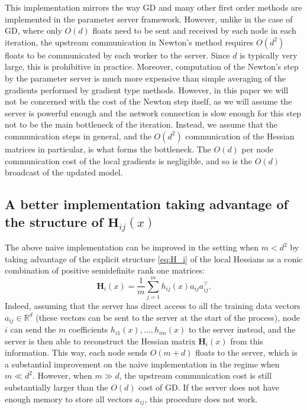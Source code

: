 \documentclass[10pt]{article}
\newcommand{\squeeze}{}
\newcommand{\R}{\mathbb{R}}
\newcommand{\newalpha}{h}
\newcommand{\mH}{\mathbf{H}}
\begin{document}
This implementation mirrors the way GD and many other first order methods are implemented in the parameter server framework. However, unlike in the case of GD, where only $O(d)$ floats need to be sent and received by each node in each iteration, the upstream communication in Newton's method requires $O(d^2)$ floats to be communicated by each worker to the server. Since $d$ is typically very large, this is prohibitive in practice. Moreover, computation of the Newton's step by the parameter server is much more expensive than simple averaging of the gradients performed by gradient type methods. However, in this paper we will not be concerned with the cost of the Newton step itself, as we will assume the server is powerful enough and the network connection is slow enough for this step not to be the main bottleneck of the iteration. Instead, we assume that the communication steps in general, and the $O(d^2)$ communication of the Hessian matrices in particular,  is what forms the bottleneck. The $O(d)$ per node communication cost of the local gradients is negligible,  and so is the $O(d)$ broadcast of the updated model.  

\subsection{A better implementation taking advantage of the structure of $\mH_{ij}(x)$} \label{subsec:Naive2}

The above naive implementation can be improved in the setting when $m < d^2$ by taking advantage of the explicit structure \eqref{eq:H_i} of the local Hessians as a conic combination of positive semidefinite rank one matrices:
\begin{equation}\label{eq:Newton2}
\squeeze\mH_i(x) = \frac{1}{m}\sum \limits_{j=1}^m \newalpha_{ij}(x) a_{ij}a_{ij}^\top.\end{equation}
Indeed, assuming that the server has direct access to all the training data vectors $a_{ij}\in \R^d$  (these vectors can be sent to the server at the start of the process), node $i$ can send the $m$ coefficients $\newalpha_{i1}(x), \dots, \newalpha_{im}(x)$ to the server instead, and the server is then able to reconstruct the Hessian matrix $\mH_i(x)$ from this information. This way, each node sends $O(m+d)$ floats to the server, which is a substantial improvement on the naive implementation in the regime when $m\ll d^2$.  However, when $m\gg d$, the upstream communication cost is still substantially larger than the $O(d)$ cost of GD.  If the server does not have enough memory to store all vectors $a_{ij}$, this procedure does not work.
\end{document}
